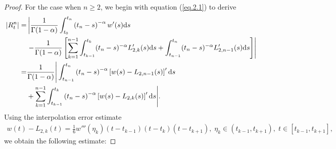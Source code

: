 \documentclass{siamart171218}
\theoremstyle{remark}
\theoremstyle{example}
\numberwithin{equation}{section}
\begin{document}
\begin{proof}
For the case when $n \ge 2$, we begin with equation (\ref{eq.2.1}) to derive
\begin{align*}
    \left|R_t^n\right| =&\left| \frac{1}{\Gamma(1-\alpha)}\int_{t_{0}}^{t_{n}} \left(t_{n}-s\right)^{-\alpha}
    w'(s)\mathrm{d}s \right. \\ &\left.-\frac{1}{\Gamma(1-\alpha)}\left[\sum\limits_{k=1}^{n-1}
     \int_{t_{k-1}}^{t_k} (t_{n}-s)^{-\alpha} L'_{2,k}(s) \mathrm{d}s+\int_{t_{n-1}}^{t_{n}} (t_{n}-s)^{-\alpha}
     L'_{2,n-1}(s) \mathrm{d}s \right]  \right|\\
    =& \frac{1}{\Gamma(1-\alpha)} \Bigg{| }  \int_{t_{n-1}}^{t_n} \left(t_{n}-s\right)^{-\alpha}\left[w(s)-L_{2,n-1}(s) \right]'\mathrm{d}s  \\
    &+\sum\limits_{k=1}^{n-1} \int_{t_{k-1}}^{t_k}\left(t_{n}-s\right)^{-\alpha}\left[w(s)-L_{2,k}(s) \right]'\mathrm{d}s \Bigg{| } .
\end{align*}
Using the interpolation error estimate
\begin{align*}
 w(t)-L_{2,k}(t)=\frac{1}{6}w'''(\eta_k)(t-t_{k-1})(t-t_k)(t-t_{k+1}),\; \eta_{k} \in (t_{k-1},t_{k+1}),\;t\in[t_{k-1},t_{k+1}],
\end{align*}
we obtain the following estimate:


\end{proof}
\end{document}
